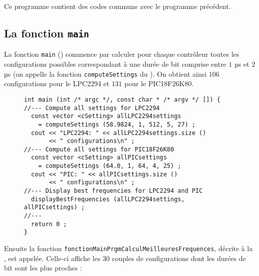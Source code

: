 Ce programme contient des codes communs avec le programme précédent.





\subsection{La fonction \texttt{main}}


La fonction \texttt{main} () commence par calculer pour chaque contrôleur toutes les configurations possibles correspondant à une durée de bit comprise entre $1$ µs et $2$ µs (on appelle la fonction \texttt{computeSettings} du ). On obtient ainsi $106$ configurations pour le LPC2294 et $131$ pour le PIC18F26K80.





\begin{figure}[!ht]
\begin{lstlisting}
int main (int /* argc */, const char * /* argv */ []) {
//--- Compute all settings for LPC2294
  const vector <cSetting> allLPC2294settings
    = computeSettings (58.9824, 1, 512, 5, 27) ;
  cout << "LPC2294: " << allLPC2294settings.size ()
       << " configurations\n" ;
//--- Compute all settings for PIC18F26K80
  const vector <cSetting> allPICsettings
    = computeSettings (64.0, 1, 64, 4, 25) ;
  cout << "PIC: " << allPICsettings.size ()
       << " configurations\n" ;
//--- Display best frequencies for LPC2294 and PIC
  displayBestFrequencies (allLPC2294settings, allPICsettings) ;
//---
  return 0 ;
}
\end{lstlisting}
\end{figure}

Ensuite la fonction \texttt{fonctionMainPrgmCalculMeilleuresFrequences}, décrite à la , est appelée. Celle-ci affiche les $30$ couples de configurations dont les durées de bit sont les plus proches :


